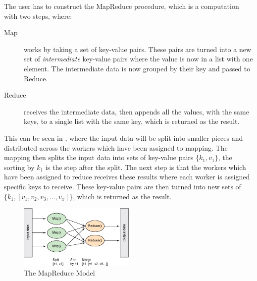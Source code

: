 The user has to construct the MapReduce procedure, which is a computation with two steps, where: 
\begin{description}
\item[Map] works by taking a set of key-value pairs. These pairs are turned into a new set of \emph{intermediate} key-value pairs where the value is now in a list with one element. The intermediate data is now grouped by their key and passed to Reduce.
\item[Reduce] receives the intermediate data, then appends all the values, with the same keys, to a single list with the same key, which is returned as the result.
\end{description}
This can be seen in , where the input data will be split into smaller pieces and distributed across the workers which have been assigned to mapping. The mapping then splits the input data into sets of key-value pairs $\{k_1,v_1\}$, the sorting by $k_1$ is the step after the split. The next step is that the workers which have been assigned to reduce receives these results where each worker is assigned specific keys to receive. These key-value pairs are then turned into new sets of $\{k_1, [v_1,v_2,v_3,\dots,v_x]\}$, which is returned as the result.


\begin{figure}[!htb]
  \centering
    \includegraphics[width=0.50\textwidth]{img/mapreduceimage}
  \caption{The MapReduce Model}\label{fig:mapreduce}
\end{figure}

